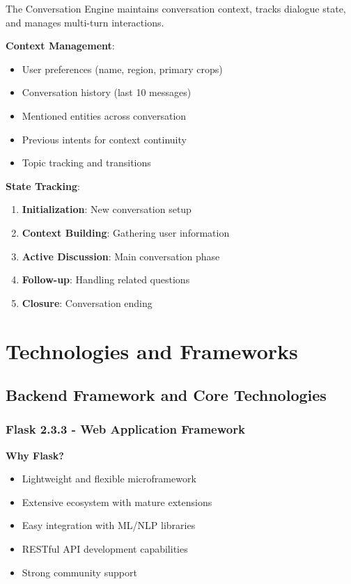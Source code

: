 \documentclass[12pt,a4paper]{article}
\begin{document}
The Conversation Engine maintains conversation context, tracks dialogue state, and manages multi-turn interactions.

\textbf{Context Management}:
\begin{itemize}[leftmargin=*]
    \item User preferences (name, region, primary crops)
    \item Conversation history (last 10 messages)
    \item Mentioned entities across conversation
    \item Previous intents for context continuity
    \item Topic tracking and transitions
\end{itemize}

\textbf{State Tracking}:
\begin{enumerate}[leftmargin=*]
    \item \textbf{Initialization}: New conversation setup
    \item \textbf{Context Building}: Gathering user information
    \item \textbf{Active Discussion}: Main conversation phase
    \item \textbf{Follow-up}: Handling related questions
    \item \textbf{Closure}: Conversation ending
\end{enumerate}

\section{Technologies and Frameworks}

\subsection{Backend Framework and Core Technologies}

\subsubsection{Flask 2.3.3 - Web Application Framework}

\textbf{Why Flask?}
\begin{itemize}[leftmargin=*]
    \item Lightweight and flexible microframework
    \item Extensive ecosystem with mature extensions
    \item Easy integration with ML/NLP libraries
    \item RESTful API development capabilities
    \item Strong community support
\end{itemize}
\end{document}
